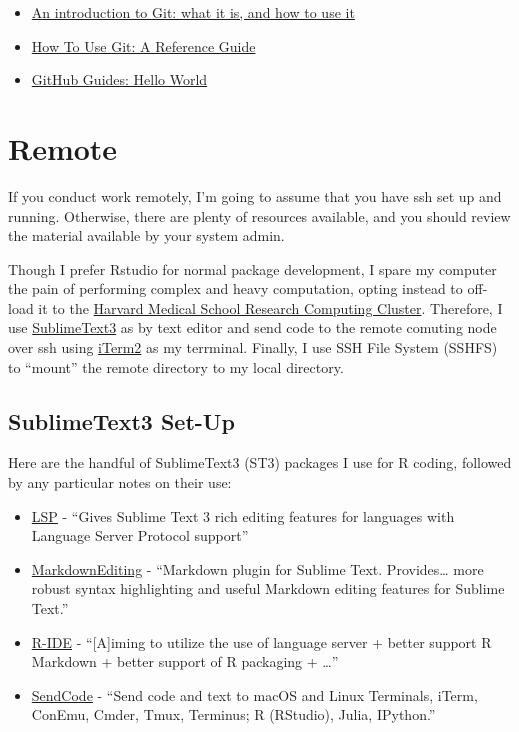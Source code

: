 \documentclass[]{book}
\providecommand{\tightlist}{%
  \setlength{\itemsep}{0pt}\setlength{\parskip}{0pt}}
\begin{document}
\begin{itemize}
\tightlist
\item
  \href{https://medium.freecodecamp.org/what-is-git-and-how-to-use-it-c341b049ae61}{An
  introduction to Git: what it is, and how to use it}
\item
  \href{https://www.digitalocean.com/community/tutorials/how-to-use-git-a-reference-guide}{How
  To Use Git: A Reference Guide}
\item
  \href{https://guides.github.com/activities/hello-world/}{GitHub
  Guides: Hello World}
\end{itemize}

\section{Remote}\label{remote}

If you conduct work remotely, I'm going to assume that you have ssh set
up and running. Otherwise, there are plenty of resources available, and
you should review the material available by your system admin.

Though I prefer Rstudio for normal package development, I spare my
computer the pain of performing complex and heavy computation, opting
instead to off-load it to the \href{https://rc.hms.harvard.edu}{Harvard
Medical School Research Computing Cluster}. Therefore, I use
\href{https://www.sublimetext.com}{SublimeText3} as by text editor and
send code to the remote comuting node over ssh using
\href{https://iterm2colorschemes.com}{iTerm2} as my terrminal. Finally,
I use SSH File System (SSHFS) to ``mount'' the remote directory to my
local directory.

\subsection{SublimeText3 Set-Up}\label{sublimetext3-set-up}

Here are the handful of SublimeText3 (ST3) packages I use for R coding,
followed by any particular notes on their use:

\begin{itemize}
\tightlist
\item
  \href{https://packagecontrol.io/packages/LSP}{LSP} - ``Gives Sublime
  Text 3 rich editing features for languages with Language Server
  Protocol support''
\item
  \href{https://packagecontrol.io/packages/MarkdownEditing}{MarkdownEditing}
  - ``Markdown plugin for Sublime Text. Provides\ldots{} more robust
  syntax highlighting and useful Markdown editing features for Sublime
  Text.''
\item
  \href{https://packagecontrol.io/packages/R-IDE}{R-IDE} -
  ``{[}A{]}iming to utilize the use of language server + better support
  R Markdown + better support of R packaging + \ldots{}''
\item
  \href{https://packagecontrol.io/packages/SendCode}{SendCode} - ``Send
  code and text to macOS and Linux Terminals, iTerm, ConEmu, Cmder,
  Tmux, Terminus; R (RStudio), Julia, IPython.''
\end{itemize}
\end{document}
